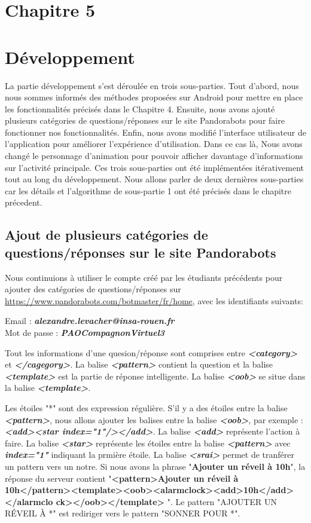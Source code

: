 \section*{Chapitre 5}
\section{Développement}
	La partie développement s'est déroulée en trois sous-parties. Tout d'abord, nous nous sommes informés des méthodes proposées sur Android pour mettre en place les fonctionnalités précisés dans le Chapitre 4. Ensuite, nous avons ajouté plusieurs catégories de questions/réponses sur le site Pandorabots pour faire fonctionner nos fonctionnalités. Enfin, nous avons modifié l'interface utilisateur de l'application pour améliorer l'expérience d'utilisation. Dans ce cas là, Nous avons changé le personnage d'animation pour pouvoir afficher davantage d'informations sur l'activité principale. Ces trois sous-parties ont été implémentées itérativement tout au long du développement. Nous allons parler de deux dernières sous-parties car les détails et l'algorithme de sous-partie 1 ont été précisés dans le chapitre précedent.

\subsection{Ajout de plusieurs catégories de questions/réponses sur le site Pandorabots}

\indent Nous continuions à utiliser le compte créé par les étudiants précédents pour ajouter des catégories de questions/réponses sur \url{https://www.pandorabots.com/botmaster/fr/home}, avec les identifiants suivants:

\begin{center}
	Email : \textbf{\emph{alexandre.levacher@insa-rouen.fr}}\\
	Mot de passe : \textbf{\emph{PAOCompagnonVirtuel3}}
\end{center}

\indent Tout les informations d'une quesion/réponse sont comprises entre \textbf{\emph{<category>}} et \textbf{\emph{</cagegory>}}. La balise \textbf{\emph{<pattern>}} contient la question et la balise \textbf{\emph{<template>}} est la partie de réponse intelligente. La balise \textbf{\emph{<oob>}} se situe dans la balise \textbf{\emph{<template>}}.

\indent Les étoiles "*" sont des expression régulière. S'il y a des étoiles entre la balise \textbf{\emph{<pattern>}}, nous allons ajouter les balises entre la balise \textbf{\emph{<oob>}}, par exemple : \textbf{\emph{<add><star index="1"/></add>}}. La balise \textbf{\emph{<add>}} représente l'action à faire. La balise \textbf{\emph{<star>}} représente les étoiles entre la balise \textbf{\emph{<pattern>}} avec \textbf{\emph{index="1"}} indiquant la prmière étoile. La balise \textbf{\emph{<srai>}} permet de tranférer un pattern vers un notre. Si nous avons la phrase "\textbf{Ajouter un réveil à 10h}", la réponse du serveur contient "\textbf{<pattern>Ajouter un réveil à 10h</pattern><template><oob><alarmclock><add>10h</add></alarmclo ck></oob></template>} ". Le pattern "AJOUTER UN RÉVEIL À *" est rediriger vers le pattern "SONNER POUR *".

